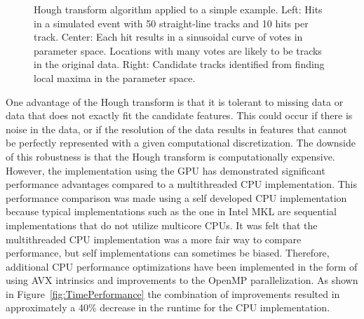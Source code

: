 \documentclass{JINST}
\begin{document}
\begin{figure}[!Hhtb]
\begin{center}
  \caption{Hough transform algorithm applied to a simple example. Left: Hits in a simulated event with 50
    straight-line tracks and 10 hits per track. Center: Each hit results in a sinusoidal curve of votes in parameter
    space. Locations with many votes are likely to be tracks in the original data. Right:
    Candidate tracks identified from finding local maxima in the parameter space.\label{fig:hough}}
\end{center}
\end{figure}

One advantage of the Hough transform is that it is tolerant to missing data or data that does not exactly fit the candidate features.  This could occur if there is noise in the data, or if the resolution of the data results in features that cannot be perfectly represented with a given computational discretization.  The downside of this robustness is that the Hough transform is computationally expensive.  However, the implementation using the GPU has demonstrated significant performance advantages compared to a multithreaded CPU implementation.  This performance comparison was made using a self developed CPU implementation because typical implementations such as the one in Intel MKL are sequential implementations that do not utilize multicore CPUs.  It was felt that the multithreaded CPU implementation was a more fair way to compare performance, but self implementations can sometimes be biased.  Therefore, additional CPU performance optimizations have been implemented in the form of using AVX intrinsics and improvements to the OpenMP parallelization.  As shown in Figure~\ref{fig:TimePerformance} the combination of improvements resulted in approximately a 40\% decrease in the runtime for the CPU implementation.
\end{document}
